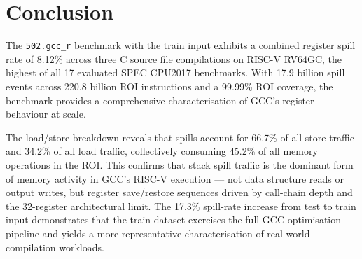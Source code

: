 \documentclass[conference]{IEEEtran}
\begin{document}
\section{Conclusion}

The \texttt{502.gcc\_r} benchmark with the train input exhibits
a combined register spill rate of 8.12\% across three C source
file compilations on RISC-V RV64GC, the highest of all 17 evaluated
SPEC CPU2017 benchmarks. With 17.9 billion spill events across
220.8 billion ROI instructions and a 99.99\% ROI coverage, the
benchmark provides a comprehensive characterisation of GCC's
register behaviour at scale.

The load/store breakdown reveals that spills account for 66.7\%
of all store traffic and 34.2\% of all load traffic, collectively
consuming 45.2\% of all memory operations in the ROI. This confirms
that stack spill traffic is the dominant form of memory activity in
GCC's RISC-V execution --- not data structure reads or output writes,
but register save/restore sequences driven by call-chain depth and
the 32-register architectural limit. The 17.3\% spill-rate increase
from test to train input demonstrates that the train dataset exercises
the full GCC optimisation pipeline and yields a more representative
characterisation of real-world compilation workloads.
\end{document}
